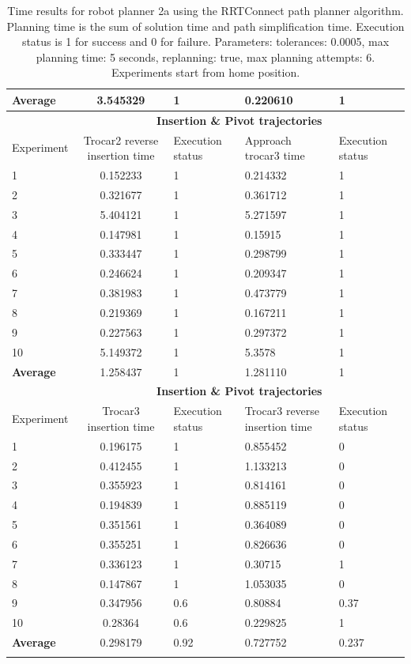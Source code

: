 \begin{longtable}{|p{2cm}|c|p{2cm}|p{2cm}|p{2cm}|}
\hline
\textbf{Average} & 3.545329	& 1	& 0.220610	& 1 \\
\hline
                          & \multicolumn{4}{c}{\textbf{Insertion \& Pivot trajectories}}                     \vline \\
\hline
Experiment                & Trocar2 reverse insertion time & Execution status & Approach trocar3 time & Execution status  \\
\hline
1 & 0.152233	& 1	& 0.214332	& 1 \\
2 & 0.321677	& 1	& 0.361712	& 1 \\
3 & 5.404121	& 1	& 5.271597	& 1 \\
4 & 0.147981	& 1	& 0.15915	& 1 \\
5 & 0.333447	& 1	& 0.298799	& 1 \\
6 & 0.246624	& 1	& 0.209347	& 1 \\
7 & 0.381983	& 1	& 0.473779	& 1 \\
8 & 0.219369	& 1	& 0.167211	& 1 \\
9 & 0.227563	& 1	& 0.297372	& 1 \\
10  & 5.149372	& 1	& 5.3578	& 1 \\
\hline
\textbf{Average} & 1.258437	& 1	& 1.281110	& 1 \\
\hline
                          & \multicolumn{4}{c}{\textbf{Insertion \& Pivot trajectories}}                     \vline \\
\hline
Experiment                & Trocar3 insertion time & Execution status & Trocar3 reverse insertion time & Execution status  \\
\hline
1 & 0.196175	& 1	& 0.855452	& 0 \\
2 & 0.412455	& 1	& 1.133213	& 0 \\
3 & 0.355923	& 1	& 0.814161	& 0 \\
4 & 0.194839	& 1	& 0.885119	& 0 \\
5 & 0.351561	& 1	& 0.364089	& 0 \\
6 & 0.355251	& 1	& 0.826636	& 0 \\
7 & 0.336123	& 1	& 0.30715	& 1 \\
8 & 0.147867	& 1	& 1.053035	& 0 \\
9 & 0.347956	& 0.6	& 0.80884	& 0.37  \\
10  & 0.28364	& 0.6	& 0.229825	& 1 \\
\hline
\textbf{Average} & 	0.298179	& 0.92 &	0.727752	& 0.237 \\
\hline

\caption{Time results for robot planner 2a using the RRTConnect path planner algorithm. Planning time is the sum of solution time and path simplification time. Execution status is 
1 for success and 0 for failure. Parameters: tolerances: 0.0005, max planning time: 5 seconds, replanning: true, max planning attempts: 6. Experiments start from home position.}
\label{robot-planner2a-rrtconnect-data}
\end{longtable}

